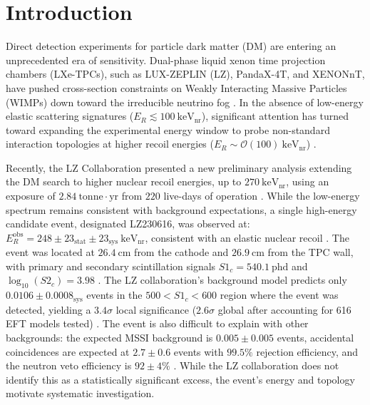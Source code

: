 \documentclass[aps,twocolumn,superscriptaddress,groupedaddress,nofootinbib,floatfix]{revtex4}
\begin{document}
\section{Introduction}

Direct detection experiments for particle dark matter (DM) are entering an unprecedented era of sensitivity. Dual-phase liquid xenon time projection chambers (LXe-TPCs), such as LUX-ZEPLIN (LZ), PandaX-4T, and XENONnT, have pushed cross-section constraints on Weakly Interacting Massive Particles (WIMPs) down toward the irreducible neutrino fog \cite{LZ2024SI,PandaX:2022osq,XENONnT2023}. In the absence of low-energy elastic scattering signatures ($E_R \lesssim 100\ \text{keV}_{\text{nr}}$), significant attention has turned toward expanding the experimental energy window to probe non-standard interaction topologies at higher recoil energies ($E_R \sim \mathcal{O}(100)\ \text{keV}_{\text{nr}}$) \cite{Fitzpatrick2012,Bramante2016}. 


Recently, the LZ Collaboration presented a new preliminary analysis extending the DM search to higher nuclear recoil energies, up to $270\ \text{keV}_{\text{nr}}$, using an exposure of $2.84\ \text{tonne}\cdot\text{yr}$ from $220$ live-days of operation \cite{LZ2026}. While the low-energy spectrum remains consistent with background expectations, a single high-energy candidate event, designated LZ230616, was observed at: $E_R^{\text{obs}} = 248 \pm 23_{\text{stat}} \pm 23_{\text{sys}}\ \text{keV}_{\text{nr}}$, consistent with an elastic nuclear recoil \cite{LZ2026}. The event was located at $26.4\ \text{cm}$ from the cathode and $26.9\ \text{cm}$ from the TPC wall, with primary and secondary scintillation signals $S1_c = 540.1\ \text{phd}$ and $\log_{10}(S2_c) = 3.98$ \cite{LZ2026}. The LZ collaboration's background model predicts only $0.0106 \pm 0.0008_{\text{sys}}$ events in the $500 < S1_c < 600$ region where the event was detected, yielding a $3.4\sigma$ local significance ($2.6\sigma$ global after accounting for 616 EFT models tested) \cite{LZ2026}. The event is also difficult to explain with other backgrounds: the expected MSSI background is $0.005 \pm 0.005$ events, accidental coincidences are expected at $2.7 \pm 0.6$ events with $99.5\%$ rejection efficiency, and the neutron veto efficiency is $92 \pm 4\%$ \cite{LZ2026}. While the LZ collaboration does not identify this as a statistically significant excess, the event's energy and topology motivate systematic investigation.
\end{document}
